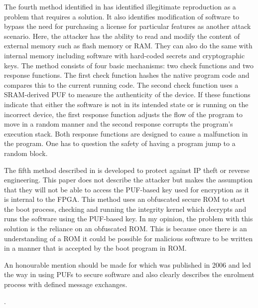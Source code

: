 The fourth method identified in \cite{Kohnhauser2015} has identified illegitimate reproduction as a problem that requires a solution. It also identifies modification of software to bypass the need for purchasing a license for particular features as another attack scenario. Here, the attacker has the ability to read and modify the content of external memory such as flash memory or RAM. They can also do the same with internal memory including software with hard-coded secrets and cryptographic keys. The method consists of four basic mechanisms: two check functions and two response functions. The first check function hashes the native program code and compares this to the current running code. The second check function uses a SRAM-derived PUF to measure the authenticity of the device. If these functions indicate that either the software is not in its intended state or is running on the incorrect device, the first response function adjusts the flow of the program to move in a random manner and the second response corrupts the program's execution stack. Both response functions are designed to cause a malfunction in the program. One has to question the safety of having a program jump to a random block.


The fifth method described in \cite{Gora2010} is developed to protect against IP theft or reverse engineering. This paper does not describe the attacker but makes the assumption that they will not be able to access the PUF-based key used for encryption as it is internal to the FPGA. This method uses an obfuscated secure ROM to start the boot process, checking and running the integrity kernel which decrypts and runs the software using the PUF-based key. In my opinion, the problem with this solution is the reliance on an obfuscated ROM. This is because once there is an understanding of a ROM it could be possible for malicious software to be written in a manner that is accepted by the boot program in ROM.

\ifnotesincluded
{}
\fi

An honourable mention should be made for \cite{Simpson2006} which was published in 2006 and led the way in using PUFs to secure software and also clearly describes the enrolment process with defined message exchanges.

\ifnotesincluded
{}.
\fi


